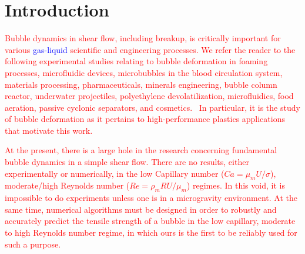 \documentclass{elsarticle}
\begin{document}

\linenumbers
\section{Introduction}

%
%
\textcolor{red} {
Bubble dynamics in shear flow, including breakup, is critically important for various \textcolor{blue} {gas-liquid} scientific and engineering processes.  We refer the reader to the following experimental studies relating to bubble deformation in foaming processes, microfluidic devices, microbubbles in the blood circulation system, materials processing, pharmaceuticals, minerals engineering, bubble column reactor, underwater projectiles, polyethylene devolatilization, microfluidics, food aeration, passive cyclonic separators, and cosmetics\cite{ChuFinBouAtaHamPug19,MulTobDreFisWin08,BenRodFauPinFerPerGarMirLim18,DreSai15,EFTEKHARI2021837,WANG2023108105,doi:10.1021/acs.langmuir.1c01814,yoshikawa2010bubble,CanedoETAL,GAO2022103212,WONG2012417,PolyethyleneDevo,FRENSE2024120579,lohse2018bubble,schluter2021small,SANOGO2023112478,hoyt2013performance,sines2020study}.  In particular, it is the study of bubble deformation as it pertains to high-performance plastics applications that motivate this work.
}
\par
\textcolor{red} {
	At the present, there is a large hole in the research concerning fundamental bubble dynamics in a simple shear flow.  There are no results, either experimentally or numerically, in the low Capillary number ($Ca=\mu_{m}U/\sigma$), moderate/high Reynolds number ($Re=\rho_{m} R U/\mu_{m}$) regimes.  In this void, it is impossible to do experiments unless one is in a microgravity environment.  At the same time, numerical algorithms must be designed in order to robustly and accurately predict the tensile strength of a bubble in the low capillary, moderate to high Reynolds number regime, in which ours is the first to be reliably used for such a purpose. 
}
\par
\end{document}
